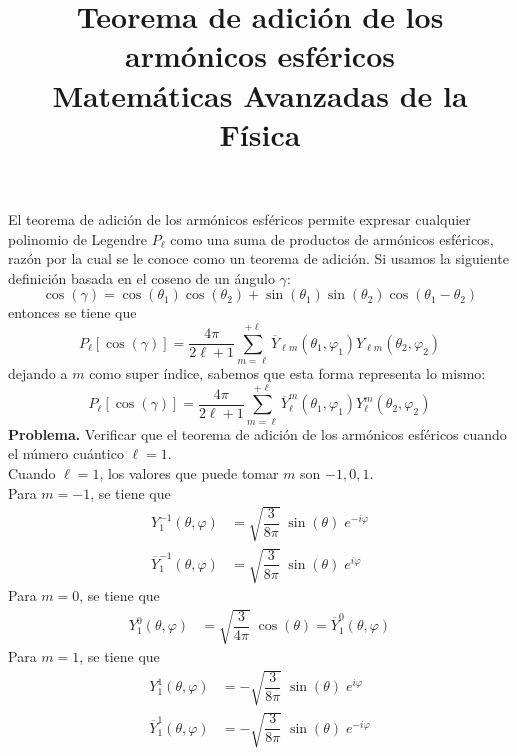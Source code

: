 
\usepackage{mathrsfs}
\usepackage{standalone}
\usepackage{tikz}
\usetikzlibrary{shapes}
\usepackage{bigints}
\newtheorem{problema}{{\it Problema}}
\newcommand{\saltosin}{\nonumber \\}
\title{Teorema de adición de los armónicos esféricos \\ {\large Matemáticas Avanzadas de la Física}}
\date{ }

\renewcommand\labelenumii{\theenumi.{\arabic{enumii}}}
\maketitle
\fontsize{14}{14}\selectfont
El teorema de adición de los armónicos esféricos permite expresar cualquier polinomio de Legendre $P_{\ell}$ como una suma de productos de armónicos esféricos, razón por la cual se le conoce como un teorema de adición. Si usamos la siguiente definición basada en el coseno de un ángulo $\gamma$:
\[ \cos (\gamma)= \cos(\theta_{1})\cos(\theta_{2}) + \sin(\theta_{1})\sin(\theta_{2}) \cos(\theta_{1} - \theta_{2}) \]
entonces se tiene que
\[ P_{\ell} [ \cos (\gamma) ] = \dfrac{4 \pi}{2 \ell + 1} \sum_{m = \ell}^{+\ell} \overline{Y}_{\ell m} (\theta_{1}, \varphi_{1}) Y_{\ell m}(\theta_{2}, \varphi_{2}) \]
dejando a $m$ como super índice, sabemos que esta forma representa lo mismo:
\[ P_{\ell} [ \cos (\gamma) ] = \dfrac{4 \pi}{2 \ell + 1} \sum_{m = \ell}^{+\ell} \overline{Y}_{\ell}^{m} (\theta_{1}, \varphi_{1}) Y_{\ell}^{m}(\theta_{2}, \varphi_{2}) \]
\textbf{Problema. } Verificar que el teorema de adición de los armónicos esféricos cuando el número cuántico $\ell=1$.
\\
Cuando $\ell = 1$, los valores que puede tomar $m$ son $-1, 0, 1$.
\\
Para $m = -1$, se tiene que
\begin{eqnarray*}
Y_{1}^{-1} (\theta, \varphi) &= \sqrt{\dfrac{3}{8 \pi}} \; \sin (\theta) \; e^{-i \varphi} \saltosin
\overline{Y}_{1}^{-1} (\theta, \varphi) &= \sqrt{\dfrac{3}{8 \pi}} \; \sin (\theta) \; e^{i \varphi}
\end{eqnarray*}
Para $m = 0$, se tiene que
\begin{eqnarray*}
Y_{1}^{0} (\theta, \varphi) &= \sqrt{\dfrac{3}{4 \pi}} \; \cos (\theta) = \overline{Y}_{1}^{0} (\theta, \varphi)
\end{eqnarray*}
Para $m = 1$, se tiene que
\begin{eqnarray*}
Y_{1}^{1} (\theta, \varphi) &= - \sqrt{\dfrac{3}{8 \pi}} \; \sin (\theta) \; e^{i \varphi} \saltosin
\overline{Y}_{1}^{1} (\theta, \varphi) &= - \sqrt{\dfrac{3}{8 \pi}} \; \sin (\theta) \; e^{-i \varphi}
\end{eqnarray*}
